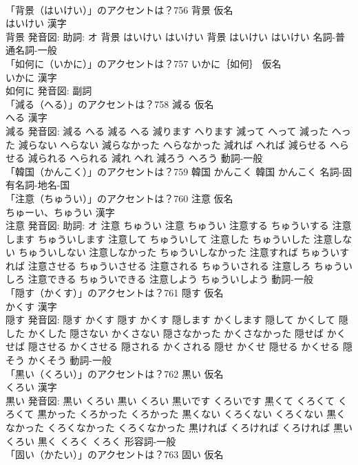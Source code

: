 \documentclass[8pt]{extreport}
\begin{document}
\begin{CJK}{UTF8}{min}
\\	「背景（はいけい）」のアクセントは？756	背景 仮名　
\\	はいけい 漢字　
\\	背景 発音図: 助詞: オ	背景 はいけい はいけい		背景 はいけい はいけい				名詞-普通名詞-一般 
\\	「如何に（いかに）」のアクセントは？757	いかに｛如何｝ 仮名　
\\	いかに 漢字　
\\	如何に 発音図:							副詞 
\\	「減る（へる）」のアクセントは？758	減る 仮名　
\\	へる 漢字　
\\	減る 発音図:	減る へる		減る へる 減ります へります 減って へって 減った へった 減らない へらない 減らなかった へらなかった 減れば へれば 減らせる へらせる 減られる へられる 減れ へれ 減ろう へろう				動詞-一般 
\\	「韓国（かんこく）」のアクセントは？759		韓国 かんこく		韓国 かんこく				名詞-固有名詞-地名-国 
\\	「注意（ちゅうい）」のアクセントは？760	注意 仮名　
\\	ちゅーい、ちゅうい 漢字　
\\	注意 発音図: 助詞: オ	注意 ちゅうい		注意 ちゅうい 注意する ちゅういする 注意します ちゅういします 注意して ちゅういして 注意した ちゅういした 注意しない ちゅういしない 注意しなかった ちゅういしなかった 注意すれば ちゅういすれば 注意させる ちゅういさせる 注意される ちゅういされる 注意しろ ちゅういしろ 注意できる ちゅういできる 注意しよう ちゅういしよう				動詞-一般 
\\	「隠す（かくす）」のアクセントは？761	隠す 仮名　
\\	かくす 漢字　
\\	隠す 発音図:	隠す かくす		隠す かくす 隠します かくします 隠して かくして 隠した かくした 隠さない かくさない 隠さなかった かくさなかった 隠せば かくせば 隠させる かくさせる 隠される かくされる 隠せ かくせ 隠せる かくせる 隠そう かくそう				動詞-一般 
\\	「黒い（くろい）」のアクセントは？762	黒い 仮名　
\\	くろい 漢字　
\\	黒い 発音図:	黒い くろい		黒い くろい 黒いです くろいです 黒くて くろくて くろくて 黒かった くろかった くろかった 黒くない くろくない くろくない 黒くなかった くろくなかった くろくなかった 黒ければ くろければ くろければ 黒い くろい 黒く くろく くろく				形容詞-一般 
\\	「固い（かたい）」のアクセントは？763	固い 仮名　

\end{CJK}
\end{document}
